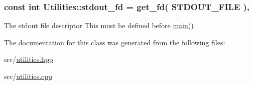 \hypertarget{class_utilities_ac910b642c4a135def84f8cc66a865138}{
\subsubsection[{stdout\-\_\-fd}]{\setlength{\rightskip}{0pt plus 5cm}const int Utilities\-::stdout\-\_\-fd = {\bf get\-\_\-fd}( {\bf S\-T\-D\-O\-U\-T\-\_\-\-F\-I\-L\-E} )\hspace{0.3cm}{\ttfamily [static]}, {\ttfamily [private]}}}\label{class_utilities_ac910b642c4a135def84f8cc66a865138}


The stdout file descriptor This must be defined before \hyperlink{shadow__stack_8cpp_a0ddf1224851353fc92bfbff6f499fa97}{main()} 



The documentation for this class was generated from the following files\-:\begin{DoxyCompactItemize}
\item 
src/\hyperlink{utilities_8hpp}{utilities.\-hpp}\item 
src/\hyperlink{utilities_8cpp}{utilities.\-cpp}\end{DoxyCompactItemize}
